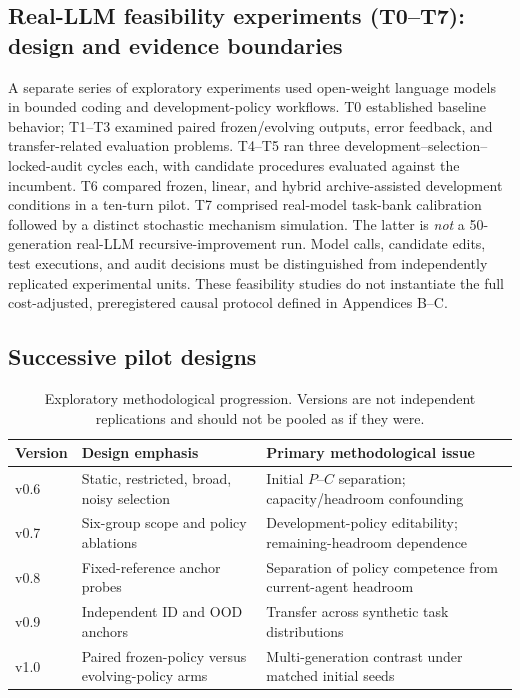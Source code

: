 \documentclass[11pt,a4paper]{article}
\begin{document}
\subsection{Real-LLM feasibility experiments (T0--T7): design and evidence boundaries}\label{sec:real-llm-methods}
A separate series of exploratory experiments used open-weight language models in bounded coding and development-policy workflows. T0 established baseline behavior; T1--T3 examined paired frozen/evolving outputs, error feedback, and transfer-related evaluation problems. T4--T5 ran three development--selection--locked-audit cycles each, with candidate procedures evaluated against the incumbent. T6 compared frozen, linear, and hybrid archive-assisted development conditions in a ten-turn pilot. T7 comprised real-model task-bank calibration followed by a distinct stochastic mechanism simulation. The latter is \emph{not} a 50-generation real-LLM recursive-improvement run. Model calls, candidate edits, test executions, and audit decisions must be distinguished from independently replicated experimental units. These feasibility studies do not instantiate the full cost-adjusted, preregistered causal protocol defined in Appendices B--C.



\subsection{Successive pilot designs}
\begin{table}[htbp]\centering\small
\begin{tabularx}{\linewidth}{@{}l l X@{}}\toprule
Version & Design emphasis & Primary methodological issue \\\midrule
v0.6 & Static, restricted, broad, noisy selection & Initial $P$--$C$ separation; capacity/headroom confounding \\
v0.7 & Six-group scope and policy ablations & Development-policy editability; remaining-headroom dependence \\
v0.8 & Fixed-reference anchor probes & Separation of policy competence from current-agent headroom \\
v0.9 & Independent ID and OOD anchors & Transfer across synthetic task distributions \\
v1.0 & Paired frozen-policy versus evolving-policy arms & Multi-generation contrast under matched initial seeds \\\bottomrule
\end{tabularx}\caption{Exploratory methodological progression. Versions are not independent replications and should not be pooled as if they were.}\label{tab:design}
\end{table}
\end{document}
